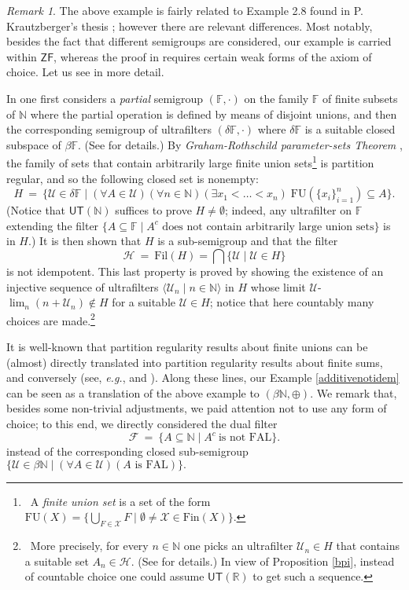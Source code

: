 \documentclass{amsart}
\theoremstyle{definition}
\theoremstyle{remark}
\newtheorem{remark}[theorem]{Remark}
\def\F{\mathscr{F}}
\def\H{\mathscr{H}}
\def\U{\mathscr{U}}
\def\X{\mathscr{X}}
\def\N{\mathbb{N}}
\def\R{\mathbb{R}}
\begin{document}
\begin{remark}
The above example is fairly related to 
Example 2.8 found in P. Krautzberger's thesis \cite{k};
however there are relevant differences.
Most notably, besides the fact that different semigroups are considered, 
our example is carried within $\textsf{ZF}$, whereas the proof in
\cite{k} requires certain weak forms of the axiom of choice. 
Let us see in more detail.


In \cite{k} one first considers a \emph{partial} semigroup
$(\mathbb{F},\cdot)$ on the family $\mathbb{F}$ 
of finite subsets of $\N$ where the partial operation is 
defined by means of disjoint unions,
and then the corresponding semigroup 
of ultrafilters $(\delta\mathbb{F},\cdot)$ where 
$\delta\mathbb{F}$ is a suitable closed subspace of $\beta\mathbb{F}$.
(See \cite[Definition 1.4]{k} for details.)
By \emph{Graham-Rothschild parameter-sets Theorem} \cite{gr},
the family of sets that contain arbitrarily large finite union sets\footnote
{~A \emph{finite union set} is a set of the form
$\text{FU}(X)=\{\bigcup_{F\in\X} F\mid \emptyset\ne \X\in\text{Fin}(X)\}$.}
is partition regular, and so the following closed set is nonempty:
$$H\ =\ \{\U\in\delta\mathbb{F}\mid
(\forall A\in\U)(\forall n\in\N)(\exists x_1<\ldots <x_{n})\;
\text{FU}(\{x_{i}\}_{i=1}^{n})\subseteq A\}.$$ 
(Notice that $\textsf{UT}(\N)$ suffices to prove $H\ne\emptyset$; 
indeed, any ultrafilter on $\mathbb{F}$
extending the filter $\{A\subseteq\mathbb{F}\mid A^{c} 
\text{ does not contain arbitrarily large union sets}\}$
is in $H$.)
It is then shown that $H$ is a sub-semigroup
and that the filter 
$$\H\ =\ \text{Fil}(H)=\bigcap\{\U\mid\U\in H\}$$
is not idempotent. This last property is proved by showing the
existence of an injective sequence of ultrafilters 
$\langle\U_n\mid n\in\N\rangle$ in $H$ 
whose limit $\U$-$\lim_n(n+\U_n)\notin H$ for a suitable $\U\in H$;
notice that here countably many choices are made.\footnote
{~More precisely, for every $n\in\N$ one picks an ultrafilter $\U_n\in H$ 
that contains a suitable set $A_n\in\H$. (See \cite{k} for details.)
In view of Proposition \ref{bpi}, instead of
countable choice one could assume $\textsf{UT}(\R)$ 
to get such a sequence.}

It is well-known that partition regularity results about finite unions
can be (almost) directly translated into partition regularity results about finite sums,
and conversely (see, \emph{e.g.}, \cite[Theorem 13]{grs} and \cite[pp.113-114]{hs}).
Along these lines, our Example \ref{additivenotidem} can be
seen as a translation of the above example to $(\beta\N,\oplus)$.
We remark that, besides some non-trivial adjustments,
we paid attention not to use any form of choice; to this end,
we directly considered the dual filter 
$$\F\ =\ \{A\subseteq\N\mid A^c\ \text{is not FAL}\}.$$
instead of the corresponding closed sub-semigroup 
$\{\U\in\beta\N\mid(\forall A\in\U)(A\text{ is FAL})\}.$
\end{remark}
\end{document}
